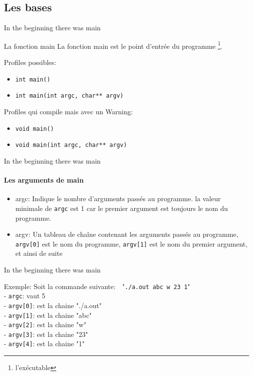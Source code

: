 \documentclass{beamer}
\begin{document}
\begin{darkframes}
  	\subsection{Les bases}
  	\begin{frame}{In the beginning there was main}
  		\begin{block}{La fonction main}
  			La fonction \alert{main} est le point d'entrée du programme \footnote[frame]{l'exécutable}.
  		\end{block}
  		\begin{exampleblock}{Profiles possibles:}
  			\begin{itemize}
  				\item \texttt{int main()}
  				\item \texttt{int main(int argc, char** argv)}
  			\end{itemize}
  		\end{exampleblock}
  		\begin{alertblock}{Profiles qui compile mais avec un Warning:}
  			\begin{itemize}
	  			\item \texttt{void main()}
	  			\item \texttt{void main(int argc, char** argv)}
  			\end{itemize}
  		\end{alertblock}
  	\end{frame}
  
  	\begin{frame}{In the beginning there was main}
		\framesubtitle{Les arguments de main}
		\begin{itemize}
			\item \alert{argc}: Indique le nombre d'arguments passés au programme. la valeur minimale de \texttt{argc} est 1 car le premier argument est toujours le nom du programme.
			\item \alert{argv}: Un tableau de chaîne contenant les arguments passés au programme, \texttt{argv[0]} est le nom du programme, \texttt{argv[1]} est le nom du premier argument, et ainsi de suite
		\end{itemize}
  	\end{frame}
  
  	\begin{frame}{In the beginning there was main}
	  	\begin{exampleblock}{Exemple:}
	  		Soit la commande suivante:~~"\texttt{./a.out abc w 23 1}" \\
	  		- \texttt{argc}: vaut 5 \\
	  		- \texttt{argv[0]}: est la chaine "./a.out" \\
	  		- \texttt{argv[1]}: est la chaine "abc" \\
	  		- \texttt{argv[2]}: est la chaine "w" \\
	  		- \texttt{argv[3]}: est la chaine "23" \\
	  		- \texttt{argv[4]}: est la chaine "1" \\
	  	\end{exampleblock}
  	\end{frame}
  

\end{darkframes}
\end{document}
